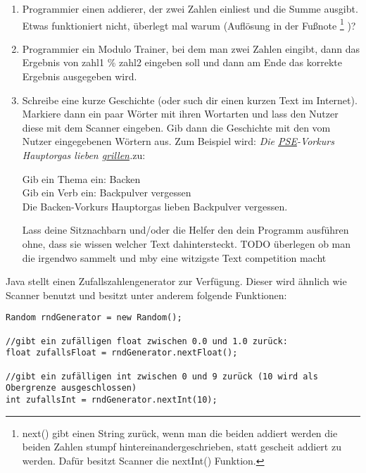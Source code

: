 \documentclass{../../sheet}
\begin{document}
\begin{enumerate}
    \item Programmier einen addierer, der zwei Zahlen einliest und die Summe ausgibt. Etwas funktioniert nicht, überlegt mal warum (Auflösung in der Fußnote
          \footnote{
              next() gibt einen String zurück, wenn man die beiden addiert werden die beiden Zahlen stumpf hintereinandergeschrieben, statt gescheit addiert zu werden. Dafür besitzt Scanner die nextInt() Funktion.
          }
          )?
    \item Programmier ein Modulo Trainer, bei dem man zwei Zahlen eingibt, dann das Ergebnis von zahl1 \% zahl2 eingeben soll und dann am Ende das korrekte Ergebnis ausgegeben wird.
    \item Schreibe eine kurze Geschichte (oder such dir einen kurzen Text im Internet). Markiere dann ein paar Wörter mit ihren Wortarten und lass den Nutzer diese mit dem Scanner eingeben. Gib dann die Geschichte mit den vom Nutzer eingegebenen Wörtern aus. Zum Beispiel wird: \textquotesingle\textquotesingle\textit{Die \underline{PSE}-Vorkurs Hauptorgas lieben \underline{grillen}.}\textquotesingle\textquotesingle \space zu:
          \begin{ausgabe}
              Gib ein Thema ein: Backen\\
              Gib ein Verb ein: Backpulver vergessen\\
              Die Backen-Vorkurs Hauptorgas lieben Backpulver vergessen.
          \end{ausgabe}
          Lass deine Sitznachbarn und/oder die Helfer den dein Programm ausführen ohne, dass sie wissen welcher Text dahintersteckt. TODO überlegen ob man die irgendwo sammelt und mby eine witzigste Text competition macht
\end{enumerate}

\newpage
{}
Java stellt einen Zufallszahlengenerator zur Verfügung. Dieser wird ähnlich wie Scanner benutzt und besitzt unter anderem folgende Funktionen:

\begin{verbatim}
Random rndGenerator = new Random();

//gibt ein zufälligen float zwischen 0.0 und 1.0 zurück:
float zufallsFloat = rndGenerator.nextFloat();

//gibt ein zufälligen int zwischen 0 und 9 zurück (10 wird als Obergrenze ausgeschlossen)
int zufallsInt = rndGenerator.nextInt(10);
\end{verbatim}
\end{document}
